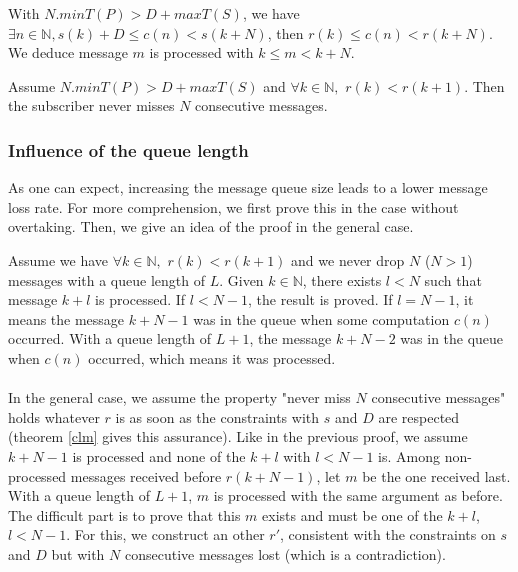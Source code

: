 With $N.minT(P) > D + maxT(S)$, we have $\exists n \in \mathbb N, s(k) + D \leq c(n) < s(k + N)$, then $r(k) \leq c(n) < r(k + N)$. We deduce message $m$ is processed with $k \leq m < k + N$.

\begin{thm}\label{clm2}

Assume $N.minT(P) > D + maxT(S)$ and $\forall k \in \mathbb{N},\,\, r(k) < r(k + 1)$. Then the subscriber never misses $N$ consecutive messages.
\end{thm}


\subsubsection{Influence of the queue length}

As one can expect, increasing the message queue size leads to a lower message loss rate. For more comprehension, we first prove this in the case without overtaking. 
Then, we give an idea of the proof in the general case.

Assume we have $\forall k \in \mathbb{N},\,\, r(k) < r(k + 1)$ and we never drop $N$ ($N > 1$) messages with a queue length of $L$. Given $k \in \mathbb N$, there exists $l < N$ such that message $k + l$ is processed. 
If $l < N - 1$, the result is proved. If $l = N - 1$, it means the message $k + N - 1$ was in the queue when some computation $c(n)$ occurred.
With a queue length of $L + 1$, the message $k + N - 2$ was in the queue when $c(n)$ occurred, which means it was processed.

\paragraph{ }
In the general case, we assume the property "never miss $N$ consecutive messages" holds whatever $r$ is as soon as the constraints with $s$ and $D$ are respected (theorem \ref{clm} gives this assurance).
Like in the previous proof, we assume $k + N - 1$ is processed and none of the $k + l$ with $l < N - 1$ is. 
Among non-processed messages received before $r(k + N - 1)$, let $m$ be the one received last. With a queue length of $L + 1$, $m$ is processed with the same argument as before. The difficult part is to prove that this $m$ exists and must be one of the $k + l$, $l < N - 1$.
For this, we construct an other $r'$, consistent with the constraints on $s$ and $D$ but with $N$ consecutive messages lost (which is a contradiction).

